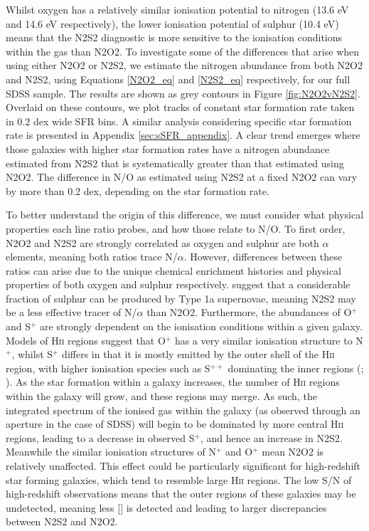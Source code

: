 \documentclass[usenatbib]{mnras} %
\begin{document}
Whilst oxygen has a relatively similar ionisation potential to nitrogen (13.6 eV and 14.6 eV respectively), the lower ionisation potential of sulphur (10.4 eV) means that the N2S2 diagnostic is more sensitive to the ionisation conditions within the gas than N2O2. To investigate some of the differences that arise when using either N2O2 or N2S2, we estimate the nitrogen abundance from both N2O2 and N2S2, using Equations \ref{N2O2_eq} and \ref{N2S2_eq} respectively, for our full SDSS sample. The results are shown as grey contours in Figure \ref{fig:N2O2vN2S2}. Overlaid on these contours, we plot tracks of constant star formation rate taken in 0.2 dex wide SFR bins. A similar analysis considering specific star formation rate is presented in Appendix \ref{sec:sSFR_appendix}. A clear trend emerges where those galaxies with higher star formation rates have a nitrogen abundance estimated from N2S2 that is systematically greater than that estimated using N2O2. The difference in N/O as estimated using N2S2 at a fixed N2O2 can vary by more than 0.2 dex, depending on the star formation rate.

To better understand the origin of this difference, we must consider what physical properties each line ratio probes, and how those relate to N/O. To first order, N2O2 and N2S2 are strongly correlated as oxygen and sulphur are both $\alpha$ elements, meaning both ratios trace N/$\alpha$. However, differences between these ratios can arise due to the unique chemical enrichment histories and physical properties of both oxygen and sulphur respectively. \cite{Kobayashi_2020} suggest that a considerable fraction of sulphur can be produced by Type 1a supernovae, meaning N2S2 may be a less effective tracer of N/$\alpha$ than N2O2. Furthermore, the abundances of O$^+$ and S$^+$ are strongly dependent on the ionisation conditions within a given galaxy. Models of \textsc{Hii} regions suggest that O$^+$ has a very similar ionisation structure to N$^+$, whilst S$^+$ differs in that it is mostly emitted by the outer shell of the \textsc{Hii} region, with higher ionisation species such as S$^{++}$ dominating the inner regions (\citealt{Levesque_2010}; \citealt{Mannucci_2021}). As the star formation within a galaxy increases, the number of \textsc{Hii} regions within the galaxy will grow, and these regions may merge. As such, the integrated spectrum of the ionised gas within the galaxy (as observed through an aperture in the case of SDSS) will begin to be dominated by more central \textsc{Hii} regions, leading to a decrease in observed S$^+$, and hence an increase in N2S2. Meanwhile the similar ionisation structures of N$^+$ and O$^+$ mean N2O2 is relatively unaffected. This effect could be particularly significant for high-redshift star forming galaxies, which tend to resemble large \textsc{Hii} regions. The low S/N of high-redshift observations means that the outer regions of these galaxies may be undetected, meaning less [] is detected and leading to larger discrepancies between N2S2 and N2O2.
\end{document}
